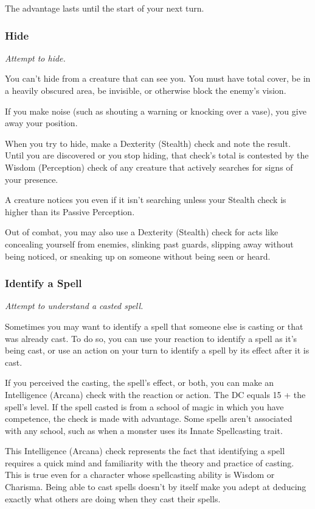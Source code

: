     The advantage lasts until the start of your next turn.
\subsubsection{Hide}
    \textit{Attempt to hide.}

    You can't hide from a creature that can see you.
    You must have total cover, be in a heavily obscured area, be invisible, or otherwise block the enemy's vision.

    If you make noise (such as shouting a warning or knocking over a vase), you give away your position.

    When you try to hide, make a Dexterity (Stealth) check and note the result.
    Until you are discovered or you stop hiding, that check's total is contested by the Wisdom (Perception) check of any creature that actively searches for signs of your presence.

    A creature notices you even if it isn't searching unless your Stealth check is higher than its Passive Perception.

    Out of combat, you may also use a Dexterity (Stealth) check for acts like concealing yourself from enemies, slinking past guards, slipping away without being noticed, or sneaking up on someone without being seen or heard.
\subsubsection{Identify a Spell}
    \textit{Attempt to understand a casted spell.}

    Sometimes you may want to identify a spell that someone else is casting or that was already cast.
    To do so, you can use your reaction to identify a spell as it's being cast, or use an action on your turn to identify a spell by its effect after it is cast.

    If you perceived the casting, the spell's effect, or both, you can make an Intelligence (Arcana) check with the reaction or action.
    The DC equals 15 + the spell's level.
    If the spell casted is from a school of magic in which you have competence, the check is made with advantage.
    Some spells aren't associated with any school, such as when a monster uses its Innate Spellcasting trait.

    This Intelligence (Arcana) check represents the fact that identifying a spell requires a quick mind and familiarity with the theory and practice of casting.
    This is true even for a character whose spellcasting ability is Wisdom or Charisma.
    Being able to cast spells doesn't by itself make you adept at deducing exactly what others are doing when they cast their spells.
